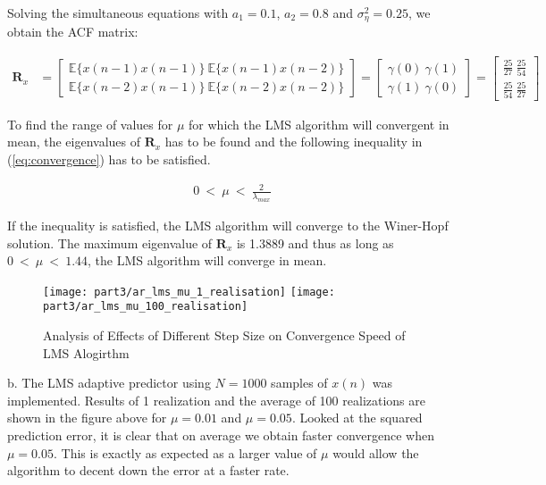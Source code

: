 \noindent{}Solving the simultaneous equations with $a_1=0.1$, $a_2=0.8$ and $\sigma_{\eta}^2=0.25$, we obtain the ACF matrix:

\begin{align*}
\textbf{R}_x &= 
\begin{bmatrix}
\mathbb{E}\{x(n-1)x(n-1)\} \ \mathbb{E}\{x(n-1)x(n-2)\} \\ 
\mathbb{E}\{x(n-2)x(n-1)\} \ \mathbb{E}\{x(n-2)x(n-2)\}
\end{bmatrix}
=
\begin{bmatrix}
\gamma(0) \ \gamma(1) \\ 
\gamma(1) \ \gamma(0)
\end{bmatrix}
= 
\begin{bmatrix}
\frac{25}{27} \ \frac{25}{54} \\ 
\frac{25}{54} \ \frac{25}{27}
\end{bmatrix}
\end{align*} 

\noindent{}To find the range of values for $\mu$ for which the LMS algorithm will convergent in mean, the eigenvalues of $\textbf{R}_x$ has to be found and the following inequality in (\ref{eq:convergence}) has to be satisfied.

\begin{align}
0 \ < \ \mu \ < \ \frac{2}{\lambda_{max}} \label{eq:convergence}
\end{align}

\noindent{}If the inequality is satisfied, the LMS algorithm will converge to the Winer-Hopf solution. The maximum eigenvalue of $\textbf{R}_x$ is 1.3889 and thus as long as $0 \ < \ \mu \ < \ 1.44$, the LMS algorithm will converge in mean.

\begin{figure}[H]
\centering{}
\texttt{[image: part3/ar\_lms\_mu\_1\_realisation]}
\texttt{[image: part3/ar\_lms\_mu\_100\_realisation]}
\caption{Analysis of Effects of Different Step Size on Convergence Speed of LMS Alogirthm}
\end{figure}

\noindent{}b. The LMS adaptive predictor using $N=1000$ samples of $x(n)$ was implemented. Results of 1 realization and the average of 100 realizations are shown in the figure above for $\mu=0.01$ and $\mu=0.05$. Looked at the squared prediction error, it is clear that on average we obtain faster convergence when $\mu=0.05$. This is exactly as expected as a larger value of $\mu$ would allow the algorithm to decent down the error at a faster rate.


